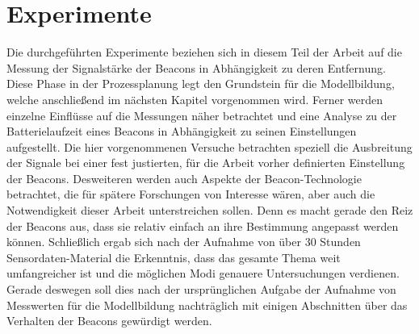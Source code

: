 \chapter{Experimente}
Die durchgeführten Experimente beziehen sich in diesem Teil der Arbeit auf die Messung der Signalstärke der Beacons in Abhängigkeit zu deren Entfernung. Diese Phase in der Prozessplanung legt den Grundstein für die Modellbildung, welche anschließend im nächsten Kapitel vorgenommen wird. Ferner werden einzelne Einflüsse auf die Messungen näher betrachtet und eine Analyse zu der Batterielaufzeit eines Beacons in Abhängigkeit zu seinen Einstellungen aufgestellt. Die hier vorgenommenen Versuche betrachten speziell die Ausbreitung der Signale bei einer fest justierten, für die Arbeit vorher definierten Einstellung der Beacons. Desweiteren werden auch Aspekte der Beacon-Technologie betrachtet, die für spätere Forschungen von Interesse wären, aber auch die Notwendigkeit dieser Arbeit unterstreichen sollen. Denn es macht gerade den Reiz der Beacons aus, dass sie relativ einfach an ihre Bestimmung angepasst werden können. Schließlich ergab sich nach der Aufnahme von über 30 Stunden Sensordaten-Material die Erkenntnis, dass das gesamte Thema weit umfangreicher ist und die möglichen Modi genauere Untersuchungen verdienen. Gerade deswegen soll dies nach der ursprünglichen Aufgabe der Aufnahme von Messwerten für die Modellbildung nachträglich mit einigen Abschnitten über das Verhalten der Beacons gewürdigt werden.
